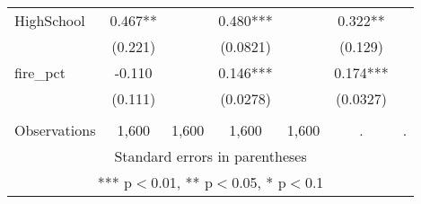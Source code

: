 \begin{tabular}{lcccccc}
HighSchool & 0.467** &  & 0.480*** &  & 0.322** &  \\
 & (0.221) &  & (0.0821) &  & (0.129) &  \\
fire\_pct & -0.110 &  & 0.146*** &  & 0.174*** &  \\
 & (0.111) &  & (0.0278) &  & (0.0327) &  \\
 &  &  &  &  &  &  \\
 Observations & 1,600 & 1,600 & 1,600 & 1,600 & . & . \\ \hline
\multicolumn{7}{c}{ Standard errors in parentheses} \\
\multicolumn{7}{c}{ *** p$<$0.01, ** p$<$0.05, * p$<$0.1} \\
\end{tabular}
